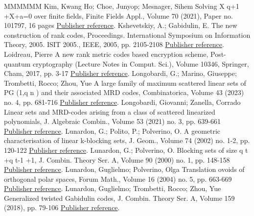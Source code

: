 \begin{thebibliography}{MMMMMM}
 Kim, Kwang Ho; Choe, Junyop; Mesnager, Sihem Solving X q+1 +X+a=0 over finite fields, Finite Fields Appl., Volume 70 (2021), Paper no. 101797, 16 pages \href{https://alco.centre-mersenne.org/articles/10.5802/alco.377/#kim2021solving}{Publisher reference}.
 Kshevetskiy, A.; Gabidulin, E. The new construction of rank codes, Proceedings. International Symposium on Information Theory, 2005. ISIT 2005., IEEE, 2005, pp. 2105-2108 \href{https://alco.centre-mersenne.org/articles/10.5802/alco.377/#kshevetskiy2005new}{Publisher reference}.
 Loidreau, Pierre A new rank metric codes based encryption scheme, Post-quantum cryptography (Lecture Notes in Comput. Sci.), Volume 10346, Springer, Cham, 2017, pp. 3-17 \href{https://alco.centre-mersenne.org/articles/10.5802/alco.377/#MR3678916}{Publisher reference}.
 Longobardi, G.; Marino, Giuseppe; Trombetti, Rocco; Zhou, Yue A large family of maximum scattered linear sets of  PG (1,q n ) and their associated MRD codes, Combinatorica, Volume 43 (2023) no. 4, pp. 681-716 \href{https://alco.centre-mersenne.org/articles/10.5802/alco.377/#longobardi2023large}{Publisher reference}.
 Longobardi, Giovanni; Zanella, Corrado Linear sets and MRD-codes arising from a class of scattered linearized polynomials, J. Algebraic Combin., Volume 53 (2021) no. 3, pp. 639-661 \href{https://alco.centre-mersenne.org/articles/10.5802/alco.377/#longobardi2021linear}{Publisher reference}.
 Lunardon, G.; Polito, P.; Polverino, O. A geometric characterisation of linear k-blocking sets, J. Geom., Volume 74 (2002) no. 1-2, pp. 120-122 \href{https://alco.centre-mersenne.org/articles/10.5802/alco.377/#lunardon2002geometric}{Publisher reference}.
 Lunardon, G.; Polverino, O. Blocking sets of size q t +q t-1 +1, J. Combin. Theory Ser. A, Volume 90 (2000) no. 1, pp. 148-158 \href{https://alco.centre-mersenne.org/articles/10.5802/alco.377/#lunardon2000blocking}{Publisher reference}.
 Lunardon, Guglielmo; Polverino, Olga Translation ovoids of orthogonal polar spaces, Forum Math., Volume 16 (2004) no. 5, pp. 663-669 \href{https://alco.centre-mersenne.org/articles/10.5802/alco.377/#lunardon2004translation}{Publisher reference}.
 Lunardon, Guglielmo; Trombetti, Rocco; Zhou, Yue Generalized twisted Gabidulin codes, J. Combin. Theory Ser. A, Volume 159 (2018), pp. 79-106 \href{https://alco.centre-mersenne.org/articles/10.5802/alco.377/#lunardon2018generalized}{Publisher reference}.

\end{thebibliography}
